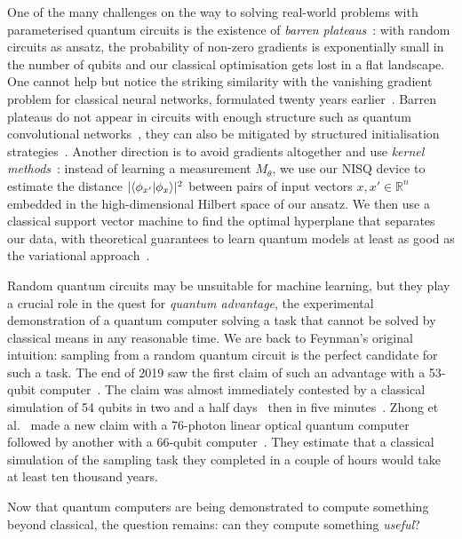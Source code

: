 One of the many challenges on the way to solving real-world problems with parameterised quantum circuits is the existence of \emph{barren plateaus}~\cite{McCleanEtAl18}:
with random circuits as ansatz, the probability of non-zero gradients is exponentially small in the number of qubits and our classical optimisation gets lost in a flat landscape.
One cannot help but notice the striking similarity with the vanishing gradient
problem for classical neural networks, formulated twenty years earlier~\cite{Hochreiter98}.
Barren plateaus do not appear in circuits with enough structure such as quantum convolutional networks~\cite{PesahEtAl21}, they can also be mitigated by structured initialisation strategies~\cite{GrantEtAl19}.
Another direction is to avoid gradients altogether and use \emph{kernel methods}~\cite{SchuldKilloran19}:
instead of learning a measurement $M_\theta$, we use our NISQ device to estimate the distance $|\langle\phi_{x'}|\phi_x\rangle|^2$ between pairs of input vectors $x, x' \in \mathbb{R}^n$ embedded in the high-dimensional Hilbert space of our ansatz.
We then use a classical support vector machine to find the optimal hyperplane that separates our data, with theoretical guarantees to learn quantum models at least as good as the variational approach~\cite{Schuld21}.

Random quantum circuits may be unsuitable for machine learning, but they play a crucial role in the quest for \emph{quantum advantage}, the experimental demonstration of a quantum computer solving a task that cannot be solved by classical means in any reasonable time.
We are back to Feynman's original intuition: sampling from a random quantum circuit is the perfect candidate for such a task.
The end of 2019 saw the first claim of such an advantage with a 53-qubit computer~\cite{AruteEtAl19}.
The claim was almost immediately contested by a classical simulation of 54 qubits in two and a half days~\cite{PednaultEtAl19} then in five minutes~\cite{YongEtAl21}.
Zhong et al.~\cite{ZhongEtAl20} made a new claim with a 76-photon linear optical quantum computer followed by another with a 66-qubit computer~\cite{WuEtAl21,ZhuEtAl21}.
They estimate that a classical simulation of the sampling task they completed in a couple of hours would take at least ten thousand years.

Now that quantum computers are being demonstrated to compute something beyond classical, the question remains: can they compute something \emph{useful}?
